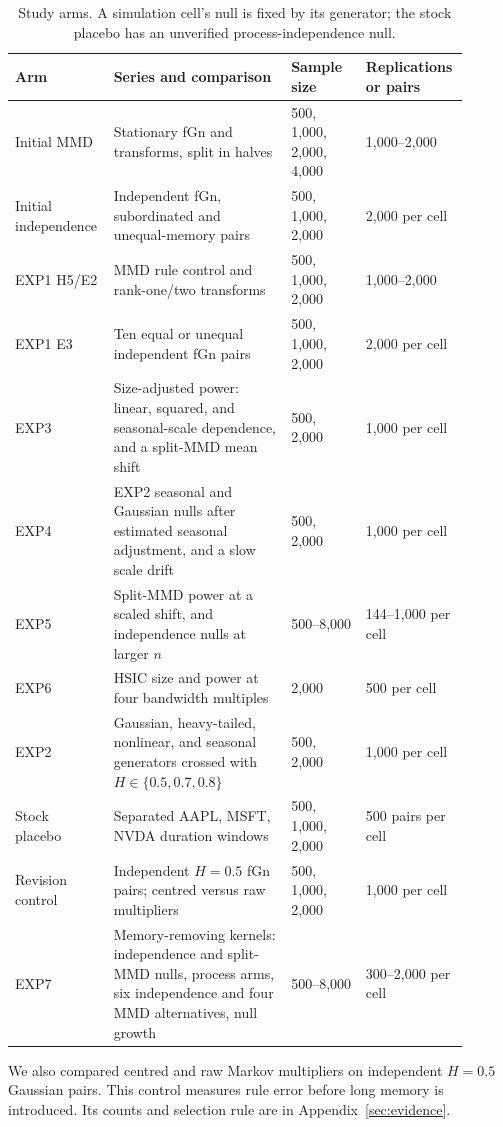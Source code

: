 \documentclass[11pt]{article}
\theoremstyle{remark}
\begin{document}
\begin{table}[H]
\centering\small
\caption{Study arms. A simulation cell's null is fixed by its generator; the stock placebo has an unverified process-independence null.}\label{tab:design}
\begin{tabular}{@{}p{0.19\linewidth}p{0.38\linewidth}p{0.16\linewidth}p{0.17\linewidth}@{}}
\toprule
Arm & Series and comparison & Sample size & Replications or pairs \\
\midrule
Initial MMD & Stationary fGn and transforms, split in halves & 500, 1,000, 2,000, 4,000 & 1,000--2,000 \\
Initial independence & Independent fGn, subordinated and unequal-memory pairs & 500, 1,000, 2,000 & 2,000 per cell \\
EXP1 H5/E2 & MMD rule control and rank-one/two transforms & 500, 1,000, 2,000 & 1,000--2,000 \\
EXP1 E3 & Ten equal or unequal independent fGn pairs & 500, 1,000, 2,000 & 2,000 per cell \\
EXP3 & Size-adjusted power: linear, squared, and seasonal-scale dependence, and a split-MMD mean shift & 500, 2,000 & 1,000 per cell \\
EXP4 & EXP2 seasonal and Gaussian nulls after estimated seasonal adjustment, and a slow scale drift & 500, 2,000 & 1,000 per cell \\
EXP5 & Split-MMD power at a scaled shift, and independence nulls at larger $n$ & 500--8,000 & 144--1,000 per cell \\
EXP6 & HSIC size and power at four bandwidth multiples & 2,000 & 500 per cell \\
EXP2 & Gaussian, heavy-tailed, nonlinear, and seasonal generators crossed with $H\in\{0.5,0.7,0.8\}$ & 500, 2,000 & 1,000 per cell \\
Stock placebo & Separated AAPL, MSFT, NVDA duration windows & 500, 1,000, 2,000 & 500 pairs per cell \\
Revision control & Independent $H=0.5$ fGn pairs; centred versus raw multipliers & 500, 1,000, 2,000 & 1,000 per cell \\
EXP7 & Memory-removing kernels: independence and split-MMD nulls, process arms, six independence and four MMD alternatives, null growth & 500--8,000 & 300--2,000 per cell \\
\bottomrule
\end{tabular}
\end{table}

We also compared centred and raw Markov multipliers on independent $H=0.5$ Gaussian pairs. This control measures rule error before long memory is introduced. Its counts and selection rule are in Appendix~\ref{sec:evidence}.
\end{document}
